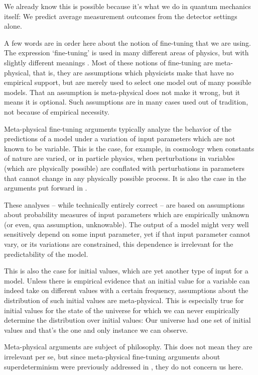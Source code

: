 \documentclass[11pt,twoside,A4]{article}
\begin{document}
We already know this is possible because it's what we do in quantum mechanics itself: We predict average measurement outcomes from the 
detector settings alone. 



A few words are in order here about the notion of fine-tuning that we are using. The expression `fine-tuning' is used in many different areas of physics, but with slightly different meanings \cite{Hossenfelder:2018ikr,lim}. Most of these notions of fine-tuning are meta-physical, that is, they are assumptions which physicists make that have no empirical support, but are merely used to select one model out of many possible models.  That an assumption is meta-physical does not make it wrong, but it means it is optional. Such assumptions are in many cases used out of tradition, not because of empirical necessity.

Meta-physical fine-tuning arguments typically analyze the behavior of the predictions of a model under a variation of input parameters which are not known to be variable. This is the case, for example, in cosmology when constants of nature are varied, or in particle physics, when perturbations in variables (which are physically possible) are conflated with perturbations in parameters that cannot change in any physically possible process. It is also the case in the arguments put forward in \cite{finetuning,Valentini1,Valentini2}. 

These analyses -- while technically entirely correct -- are based on assumptions about probability measures of input parameters which are empirically unknown (or even, qua assumption, unknowable). The output of a model might very well sensitively depend on some input parameter, yet if that input parameter cannot vary, or its variations are constrained, this dependence is irrelevant for the predictability of the model. 

This is also the case for initial values, which are yet another type of input for a model. 
Unless there is empirical evidence that an initial value for a variable can indeed take on different values with a certain frequency, assumptions about the distribution of such initial values are meta-physical. This is especially true for initial values for the state of the universe for which we can never empirically determine the distribution over initial values: Our universe had one set of initial values and that's the one and only instance we can observe. 

Meta-physical arguments are  subject of philosophy. This does not mean they are irrelevant per se, but since meta-physical fine-tuning arguments about superdeterminism were previously addressed in \cite{Hossenfelder:2019shy,otherpaper}, they do not concern us here.
\end{document}
